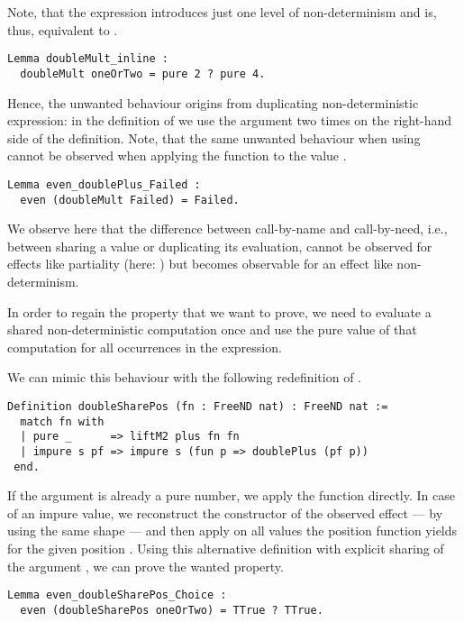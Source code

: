 Note, that the expression  introduces just one level of non-determinism and is, thus, equivalent to .

\begin{verbatim}
Lemma doubleMult_inline :
  doubleMult oneOrTwo = pure 2 ? pure 4.
\end{verbatim}

Hence, the unwanted behaviour origins from duplicating non-deterministic expression: in the definition of  we use the argument  two times on the right-hand side of the definition.
Note, that the same unwanted behaviour when using  cannot be observed when applying the function to the value .

\begin{verbatim}
Lemma even_doublePlus_Failed :
  even (doubleMult Failed) = Failed.
\end{verbatim}

We observe here that the difference between call-by-name and call-by-need, i.e., between sharing a value or duplicating its evaluation, cannot be observed for effects like partiality (here: ) but becomes observable for an effect like non-determinism.

In order to regain the property that we want to prove, we need to evaluate a shared non-deterministic computation once and use the pure value of that computation for all occurrences in the expression.

We can mimic this behaviour with the following redefinition of .

\begin{verbatim}
Definition doubleSharePos (fn : FreeND nat) : FreeND nat :=
  match fn with
  | pure _      => liftM2 plus fn fn
  | impure s pf => impure s (fun p => doublePlus (pf p))
 end.
\end{verbatim}

If the argument  is already a pure number, we apply the function  directly.
In case of an impure value, we reconstruct the constructor of the observed effect --- by using the same shape  --- and then apply  on all values the position function  yields for the given position .
Using this alternative definition with explicit sharing of the argument , we can prove the wanted property.

\begin{verbatim}
Lemma even_doubleSharePos_Choice :
  even (doubleSharePos oneOrTwo) = TTrue ? TTrue.
\end{verbatim}

